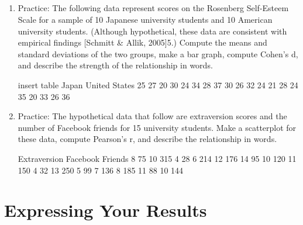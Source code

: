 \subsection{}
\begin{fullwidth}
\begin{enumerate}
\item Practice: The following data represent scores on the Rosenberg Self-Esteem Scale for a sample of 10 Japanese university students and 10 American university students. (Although hypothetical, these data are consistent with empirical findings [Schmitt \& Allik, 2005]5.) Compute the means and standard deviations of the two groups, make a bar graph, compute Cohen's d, and describe the strength of the relationship in words.
  

insert table
Japan
United States
25
27
20
30
24
34
28
37
30
26
32
24
21
28
24
35
20
33
26
36
              

\item Practice: The hypothetical data that follow are extraversion scores and the number of Facebook friends for 15 university students. Make a scatterplot for these data, compute Pearson's r, and describe the relationship in words.


 Extraversion
Facebook Friends
8
75
10
315
4
28
6
214
12
176
14
95
10
120
11
150
4
32
13
250
5
99
7
136
8
185
11
88
10
144
   
\end{enumerate}
\end{fullwidth}  


\section{Expressing Your Results}


